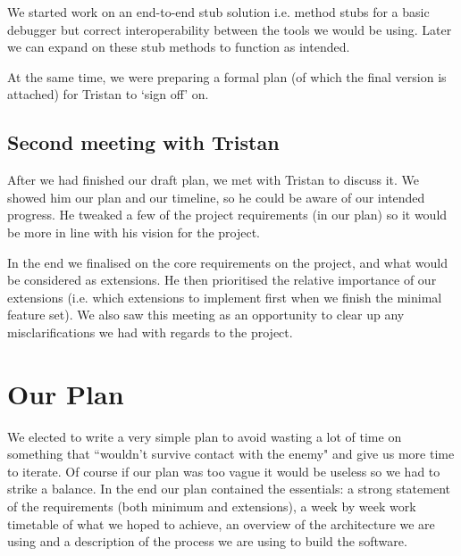 \documentclass[11pt, a4paper]{article}
\begin{document}
We started work on an end-to-end stub solution i.e. method stubs for a basic
debugger but correct interoperability between the tools we would be using.
Later we can expand on these stub methods to function as intended.

At the same time, we were preparing a formal plan (of which the final
version is attached) for Tristan to `sign off' on. 

\subsection{Second meeting with Tristan}
After we had finished our draft plan, we met with Tristan to discuss it. We
showed him our plan and our timeline, so he could be aware of our intended
progress. He tweaked a few of the project requirements (in our plan) so it
would be more in line with his vision for the project. 

In the end we finalised on the core requirements on the project, and what
would be considered as extensions. He then prioritised the relative
importance of our extensions (i.e. which extensions to implement first when
we finish the minimal feature set). We also saw this meeting as an
opportunity to clear up any misclarifications we had with regards to the
project.

\section{Our Plan}

We elected to write a very simple plan to avoid wasting a lot of time on something that ``wouldn't survive contact with the enemy" and give us more time to iterate. 
Of course if our plan was too vague it would be useless so we had to strike a balance.
In the end our plan contained the essentials: a strong statement of the requirements (both minimum and extensions), a week by week work timetable of what we hoped to achieve, an overview of the architecture we are using and a description of the process we are using to build the software.
\end{document}
